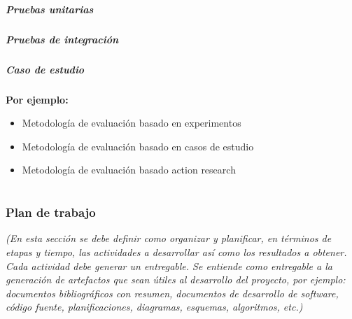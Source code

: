 \documentclass[11pt,letterpaper]{article}
\begin{document}
\subsubsection{Pruebas unitarias}

\subsubsection{Pruebas de integración}
\subsubsection{Caso de estudio}

\textbf{Por ejemplo:}
\begin{itemize}
	\item Metodología de evaluación basado en experimentos
	\item Metodología de evaluación basado en casos de estudio
		\item Metodología de evaluación basado action research
\end{itemize}

\part{%
%
}

\section{Plan de trabajo}
\emph{(En esta sección se debe definir como organizar y planificar, en términos de etapas y tiempo, las actividades a desarrollar así como los resultados a obtener.  Cada actividad debe generar un entregable. Se entiende como entregable a la generación de artefactos que sean útiles al desarrollo del proyecto, por ejemplo: documentos bibliográficos con resumen, documentos de desarrollo de software, código fuente, planificaciones, diagramas, esquemas, algoritmos, etc.)}
\end{document}
